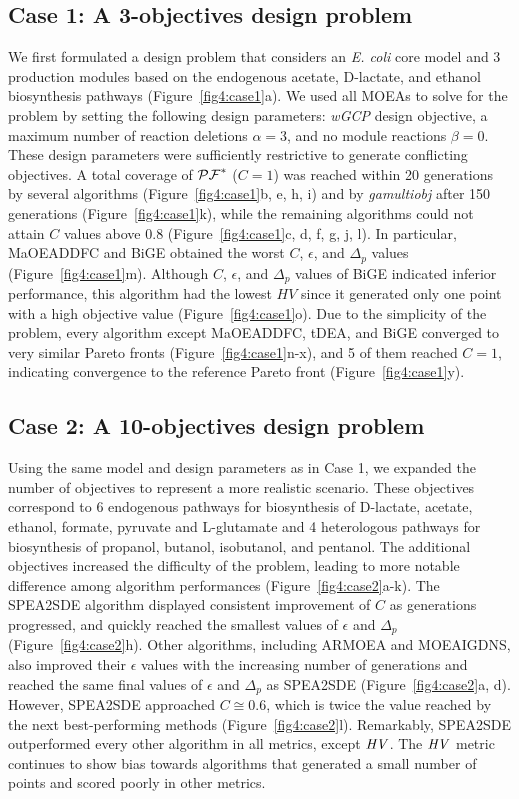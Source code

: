 {\subsection{Case 1: A 3-objectives design problem}
We first formulated a design problem that considers an \textit{E. coli} core model and 3 production modules based on the endogenous acetate, D-lactate, and ethanol biosynthesis pathways (Figure~\ref{fig4:case1}a). We used all MOEAs to solve for the problem by setting the following design parameters: \textit{wGCP} design objective, a maximum number of reaction deletions $\alpha=3$, and no module reactions $\beta=0$.
These design parameters were sufficiently restrictive to generate conflicting objectives.
A total coverage of $\mathcal{PF}^*$ ($C=1$)  was reached within 20 generations by several algorithms (Figure~\ref{fig4:case1}b, e, h, i) and by \textit{gamultiobj} after 150 generations (Figure~\ref{fig4:case1}k), while the remaining algorithms could not attain $C$ values above 0.8 (Figure~\ref{fig4:case1}c, d, f, g, j, l). In particular, MaOEADDFC and BiGE obtained the worst $C$, $\epsilon$, and $\Delta_p$ values (Figure~\ref{fig4:case1}m).
Although $C$, $\epsilon$, and $\Delta_p$ values of BiGE indicated inferior performance, this algorithm had the lowest $HV$ since it generated only one point with a high objective value (Figure~\ref{fig4:case1}o).
Due to the simplicity of the problem, every algorithm except MaOEADDFC, tDEA, and BiGE converged to very similar Pareto fronts (Figure~\ref{fig4:case1}n-x), and 5 of them reached $C=1$, indicating convergence to the reference Pareto front (Figure~\ref{fig4:case1}y).

\subsection{Case 2: A 10-objectives design problem}
Using the same model and design parameters as in Case 1, we expanded the number of objectives to represent a more realistic scenario.
These objectives correspond to 6 endogenous pathways for biosynthesis of D-lactate, acetate, ethanol, formate, pyruvate and L-glutamate and 4 heterologous pathways for biosynthesis of propanol, butanol, isobutanol, and pentanol.
The additional objectives increased the difficulty of the problem, leading to more notable difference among algorithm performances (Figure~\ref{fig4:case2}a-k).
The SPEA2SDE algorithm displayed consistent improvement of $C$ as generations progressed, and quickly reached the smallest values of  $\epsilon$ and $\Delta_p$ (Figure~\ref{fig4:case2}h).
Other algorithms, including ARMOEA and MOEAIGDNS, also improved their $\epsilon$ values with the increasing number of generations and reached the same final values of $\epsilon$ and $\Delta_p$ as SPEA2SDE (Figure~\ref{fig4:case2}a, d). However, SPEA2SDE approached $C\cong0.6$, which is twice the value reached by the next best-performing methods (Figure~\ref{fig4:case2}l). Remarkably, SPEA2SDE outperformed every other algorithm in all metrics, except $\mathit{HV}$. The $\mathit{HV}$ metric continues to show bias towards algorithms that generated a small number of points and scored poorly in other metrics.


}
